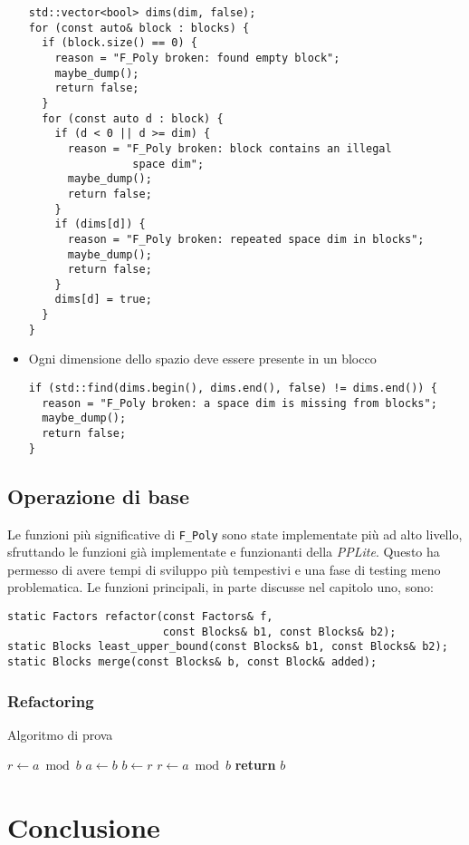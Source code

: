 \documentclass{mimosis}
\theoremstyle{definition}
\begin{document}
\begin{itemize}
\begin{verbatim}
std::vector<bool> dims(dim, false);
for (const auto& block : blocks) {
  if (block.size() == 0) {
    reason = "F_Poly broken: found empty block";
    maybe_dump();
    return false;
  }
  for (const auto d : block) {
    if (d < 0 || d >= dim) {
      reason = "F_Poly broken: block contains an illegal
                space dim";
      maybe_dump();
      return false;
    }
    if (dims[d]) {
      reason = "F_Poly broken: repeated space dim in blocks";
      maybe_dump();
      return false;
    }
    dims[d] = true;
  }
}
\end{verbatim}
\item Ogni dimensione dello spazio deve essere presente in un blocco
\begin{verbatim}
if (std::find(dims.begin(), dims.end(), false) != dims.end()) {
  reason = "F_Poly broken: a space dim is missing from blocks";
  maybe_dump();
  return false;
}
\end{verbatim}
\end{itemize}

\section{Operazione di base}
\label{sec:org6d8e57e}
Le funzioni più significative di \texttt{F\_Poly} sono state implementate più ad alto
livello, sfruttando le funzioni già implementate e funzionanti della \emph{PPLite}.
Questo ha permesso di avere tempi di sviluppo più tempestivi e una fase di
testing meno problematica. Le funzioni principali, in parte discusse nel
capitolo uno, sono:

\begin{verbatim}
static Factors refactor(const Factors& f,
                        const Blocks& b1, const Blocks& b2);
static Blocks least_upper_bound(const Blocks& b1, const Blocks& b2);
static Blocks merge(const Blocks& b, const Block& added);
\end{verbatim}

\subsection{Refactoring}
\label{sec:org441159c}


\begin{algorithm}[H]
\caption{Algoritmo di prova}
\label{prova}
\begin{algorithmic}[1]
\State $r\gets a\bmod b$
\State $a\gets b$
\State $b\gets r$
\State $r\gets a\bmod b$
\EndWhile\label{euclidendwhile}
\State \textbf{return} $b$
\EndFunction
\end{algorithmic}
\end{algorithm}

\chapter{Conclusione}
\label{sec:org3922835}
\end{document}
